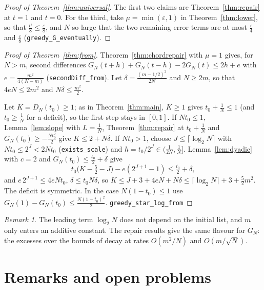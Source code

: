 \documentclass[11pt]{amsart}
\theoremstyle{remark}
\newtheorem{remark}[theorem]{Remark}
\newcommand{\lean}[1]{\texttt{\small #1}}
\newcommand{\clog}{\lceil\log_2N\rceil}
\begin{document}
\begin{proof}[Proof of Theorem~\ref{thm:universal}]
The first two claims are Theorem~\ref{thm:repair} at $t=1$ and $t=0$. For the
third, take $\mu=\min(\varepsilon,1)$ in Theorem~\ref{thm:lower}, so that
$\frac\mu8\le\frac\varepsilon8$, and $N$ so large that the two remaining error terms
are at most $\frac\varepsilon4$ and $\frac\varepsilon8$
(\lean{greedy\_G\_eventually}).
\end{proof}

\begin{proof}[Proof of Theorem~\ref{thm:from}]
Theorem~\ref{thm:chordrepair} with $\mu=1$ gives, for $N>m$, second differences
$G_N(t+h)+G_N(t-h)-2G_N(t)\le2h+e$ with $e=\frac{m^2}{4(N-m)}$
(\lean{secondDiff\_from}). Let $\delta=\frac{(m-1/2)^2}{2N}$ and $N\ge2m$, so that
$4eN\le2m^2$ and $N\delta\le\frac{m^2}2$.

Let $K=D_N(t_0)\ge1$; as in Theorem~\ref{thm:main}, $K\ge1$ gives
$t_0+\frac1N\le1$ (and $t_0\ge\frac1N$ for a deficit), so the first step stays in
$[0,1]$. If $Nt_0\le1$, Lemma~\ref{lem:slope} with $L=\frac1N$,
Theorem~\ref{thm:repair} at $t_0+\frac1N$ and $G_N(t_0)\ge-\frac{Nt_0^2}2$ give
$K\le2+N\delta$. If $Nt_0>1$, choose $J\le\clog$ with $Nt_0\le2^J<2Nt_0$
(\lean{exists\_scale}) and $h=t_0/2^J\in(\frac1{2N},\frac1N]$.
Lemma~\ref{lem:dyadic} with $c=2$ and $G_N(t_0)\le\frac{t_0}2+\delta$ give
\[
t_0\bigl(K-\tfrac52-J\bigr)-e(2^{J+1}-1)\le\tfrac{t_0}2+\delta ,
\]
and $e\,2^{J+1}\le4eNt_0$, $\delta\le t_0N\delta$, so
$K\le J+3+4eN+N\delta\le\clog+3+\frac52m^2$. The deficit is symmetric. In the
case $N(1-t_0)\le1$ use $G_N(1)-G_N(t_0)\le\frac{N(1-t_0)^2}2$.
\lean{greedy\_star\_log\_from}
\end{proof}

\begin{remark}
The leading term $\log_2N$ does not depend on the initial list, and $m$ only
enters an additive constant. The repair results give the same flavour for
$G_N$: the excesses over the bounds of \cite{Den} decay at rates
$O(m^2/N)$ and $O(m/\sqrt N)$.
\end{remark}

\section{Remarks and open problems}
\end{document}
